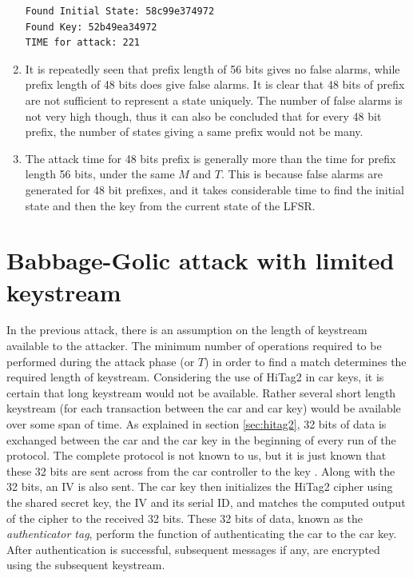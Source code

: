 \begin{enumerate}
\begin{lstlisting}[frame=tb]
Found Initial State: 58c99e374972
Found Key: 52b49ea34972
TIME for attack: 221
\end{lstlisting}

\item It is repeatedly seen that prefix length of 56 bits gives no false alarms, while prefix length of 48 bits does give false alarms. It is clear that 48 bits of prefix are not sufficient to represent a state uniquely. The number of false alarms is not very high though, thus it can also be concluded that for every 48 bit prefix, the number of states giving a same prefix would not be many.
 
\item The attack time for 48 bits prefix is generally more than the time for prefix length 56 bits, under the same $M$ and $T$. This is because false alarms are generated for 48 bit prefixes, and it takes considerable time to find the initial state and then the key from the current state of the LFSR.

\end{enumerate}

\section{Babbage-Golic attack with limited keystream}

In the previous attack, there is an assumption on the length of keystream available to the attacker. The minimum number of operations required to be performed during the attack phase (or $T$) in order to find a match determines the required length of keystream. Considering the use of HiTag2 in car keys, it is certain that long keystream would not be available. Rather several short length keystream (for each transaction between the car and car key) would be available over some span of time. As explained in section \ref{sec:hitag2}, 32 bits of data is exchanged between the car and the car key in the beginning of every run of the protocol. The complete protocol is not known to us, but it is just known that these 32 bits are sent across from the car controller to the key \cite{email-ruptor}. Along with the 32 bits, an IV is also sent. The car key then initializes the HiTag2 cipher using the shared secret key, the IV and its serial ID, and matches the computed output of the cipher to the received 32 bits. These 32 bits of data, known as the \emph{authenticator tag}, perform the function of authenticating the car to the car key. After authentication is successful, subsequent messages if any, are encrypted using the subsequent keystream.

